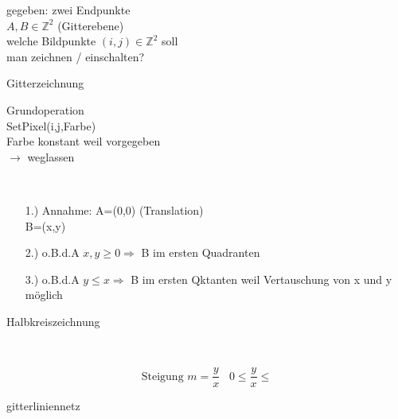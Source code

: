 \documentclass[11pt]{article}
\begin{document}
\begin{minipage}[c]{14cm}
\begin{minipage}[c]{7cm}
gegeben: zwei Endpunkte\\
$A,B \in \mathbb{Z}^2$ (Gitterebene)\\
welche Bildpunkte $(i,j) \in \mathbb{Z}^2$ soll\\ man zeichnen / einschalten?
\end{minipage}
\hfill
\begin{minipage}[c]{7cm}
\begin{minipage}[c]{7cm}
{\color{red}Gitterzeichnung}
\end{minipage}
\vfill
\begin{minipage}[c]{7cm}
Grundoperation \\
SetPixel(i,j,Farbe)\\
Farbe konstant weil vorgegeben\\
$\rightarrow$ weglassen
\end{minipage}
\end{minipage}
\end{minipage}\\
\begin{minipage}[c]{14cm}
\begin{minipage}[c]{7cm}
\begin{enumerate}
\item[1.) Annahme:] A=(0,0) (Translation)\\
B=(x,y)
\item[2.) o.B.d.A] $x,y \geq 0 \Rightarrow$ B im ersten Quadranten
\item[3.) o.B.d.A] $y \leq x \Rightarrow$ B im ersten Qktanten weil Vertauschung von x und y möglich
\end{enumerate}
\end{minipage}
\hfill
\begin{minipage}[c]{7cm}
{\color{red}Halbkreiszeichnung}
\end{minipage}
\end{minipage}\\
\begin{minipage}[c]{14cm}
\begin{minipage}[r]{7cm}
$$\text{Steigung } m=\frac{y}{x} \;\;\; 0\leq \frac{y}{x} \leq $$
\end{minipage}
\hfill
\begin{minipage}[c]{7cm}
{\color{red} gitterliniennetz}
\end{minipage}
\end{minipage}\\
\end{document}
